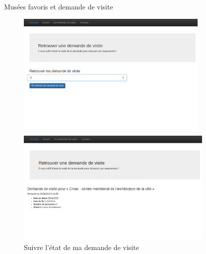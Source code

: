 \begin{frame}{Musées favoris et demande de visite}
\begin{figure}
		 { 
		\includegraphics[width=9.25cm]{screens/find_asking_visit.png}
		\caption{Retrouver une demande de visite}
		}
		
		\only<5> { 
		\includegraphics[width=9.5cm]{screens/asking_visit_state.png}
		\caption{Suivre l'état de ma demande de visite}
		}
		
	\end{figure}
\end{frame}